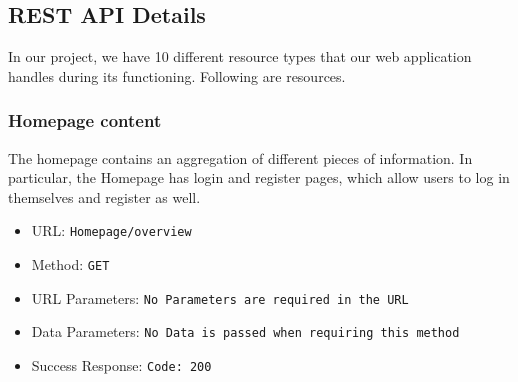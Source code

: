 \subsection{REST API Details}

In our project, we have 10 different resource types that our web application handles during its functioning. Following are resources.

\subsubsection*{Homepage content}
The homepage contains an aggregation of different pieces of information. In particular, the Homepage has login and register pages, which allow users to log in themselves and register as well.
\begin{itemize}
    \item URL: \texttt{Homepage/overview}
    \item Method: \texttt{GET}
    \item URL Parameters: \texttt{No Parameters are required in the URL}
    \item Data Parameters: \texttt{No Data is passed when requiring this method}
    \item Success Response: \texttt{Code: 200}
\end{itemize}

